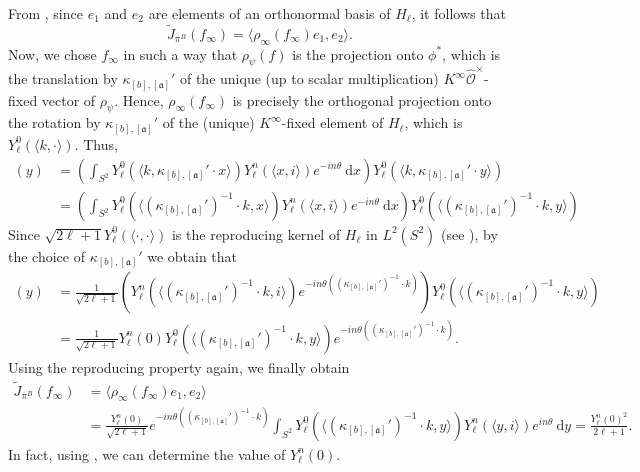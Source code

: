 \documentclass[11pt]{amsart}
\newcommand{\bigo}{\mathcal{O}}
\renewcommand{\a}{\mathfrak{a}}
\theoremstyle{definition}
\theoremstyle{remark}
\begin{document}
From \cite[\S 5.1, \S 6]{JacChen}, since $e_1$ and $e_2$ are elements of an orthonormal basis of $H_{\ell}$, it follows that $$ \tilde{J}_{\pi^B}(f_{\infty}) = \langle \rho_{\infty}(f_{\infty})e_1, e_2\rangle.$$ Now, we chose $f_{\infty}$ in such a way that $\rho_{\psi}(f)$ is the projection onto $\phi^{*}$, which is the translation by $\kappa_{[b],[\a]}'$ of the unique (up to scalar multiplication) $K^{\infty} \widehat{\bigo}^{\times}$-fixed vector of $\rho_{\psi}$. Hence, $\rho_{\infty}(f_{\infty})$ is precisely the orthogonal projection onto the rotation by $\kappa_{[b],[\a]}'$ of the (unique) $K^{\infty}$-fixed element of $H_\ell$, which is $Y_{\ell}^{0}(\langle k,\cdot \rangle)$. Thus, 
\begin{align*}
    [\rho_{\infty}(f_{\infty})e_1](y) &= \left( \int_{S^2} Y_{\ell}^{0}(\langle k,\kappa_{[b],[\a]}' \cdot x\rangle ) Y_{\ell}^{n}(\langle x,i\rangle ) e^{-in\theta} \: \mathrm{d}x \right) Y_{\ell}^{0}(\langle k,\kappa_{[b],[\a]}' \cdot y\rangle) \\
    &= \left( \int_{S^2} Y_{\ell}^{0}(\langle (\kappa_{[b],[\a]}')^{-1} \cdot k, x\rangle ) Y_{\ell}^{n}(\langle x,i\rangle ) e^{-in\theta} \: \mathrm{d}x \right) Y_{\ell}^{0}(\langle (\kappa_{[b],[\a]}')^{-1} \cdot k,y\rangle)
\end{align*}
Since $\sqrt{2\ell+1}Y_{\ell}^{0}(\langle \cdot, \cdot \rangle)$ is the reproducing kernel of $H_{\ell}$ in $L^2(S^2)$ (see \cite[\S 2.3, Lemma 2.22]{MorimotoSphere}), by the choice of $\kappa_{[b],[\a]}'$ we obtain that 
\begin{align*}
    [\rho_{\infty}(f_{\infty})e_1](y) &= \frac{1}{\sqrt{2\ell+1}} \left(Y_{\ell}^{n}(\langle (\kappa_{[b],[\a]}')^{-1} \cdot k,i \rangle) e^{-in\theta((\kappa_{[b],[\a]}')^{-1}\cdot k)}\right) Y_{\ell}^{0}(\langle (\kappa_{[b],[\a]}')^{-1} \cdot k,y\rangle) \\
    &= \frac{1}{\sqrt{2\ell+1}} Y_{\ell}^{n}(0) Y_{\ell}^{0}(\langle (\kappa_{[b],[\a]}')^{-1} \cdot k,y\rangle) e^{-in\theta((\kappa_{[b],[\a]}')^{-1}\cdot k)}.
\end{align*}
Using the reproducing property again, we finally obtain
\begin{align}
    \tilde{J}_{\pi^B}(f_{\infty}) &= \langle \rho_{\infty}(f_{\infty})e_1, e_{2}\rangle \label{ArchPartNonDepab} \\
    &= \frac{Y_{\ell}^{n}(0)}{\sqrt{2\ell+1}} e^{-in\theta((\kappa_{[b],[\a]}')^{-1}\cdot k)} \int_{S^2} Y_{\ell}^{0}(\langle (\kappa_{[b],[\a]}')^{-1} \cdot k,y\rangle ) Y_{\ell}^{n} (\langle y,i\rangle ) e^{in\theta} \: \mathrm{d}y = \frac{Y_{\ell}^{n}(0)^2}{2\ell+1}. \nonumber
\end{align}
In fact, using \cite[Ch. VII, \S 4, eq. (17)]{MacRobert}, we can determine the value of $Y_{\ell}^{n}(0)$.
\end{document}
